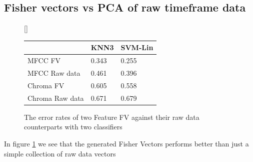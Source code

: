 \subsection{Fisher vectors vs PCA of raw timeframe data}
\begin{figure}[h]
	[\FBwidth]
	{\caption{The error rates of two Feature FV against their raw data counterparts with two classifiers}\label{rawdata}}
	{
	\begin{tabular}{|l|l|l|}
		\hline
		& KNN3  & SVM-Lin \\ \hline
		MFCC FV         & 0.343 & 0.255   \\ \hline
		MFCC Raw data   & 0.461 & 0.396   \\ \hline
		Chroma FV       & 0.605 & 0.558   \\ \hline
		Chroma Raw data & 0.671 & 0.679   \\ \hline
	\end{tabular}
	}
\end{figure}
In figure \ref{rawdata} we see that the generated Fisher Vectors performs better than just a simple collection of raw data vectors

